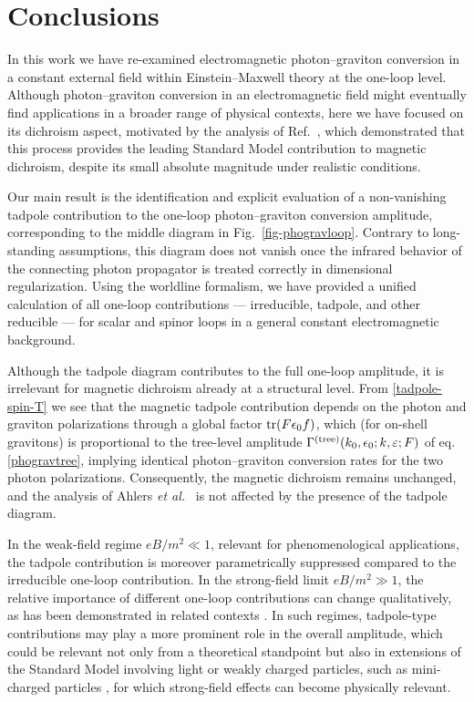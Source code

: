 \documentclass[a4paper,11pt]{article}
\begin{document}
\section{Conclusions}
\label{conc}
In this work we have re-examined electromagnetic photon–graviton conversion in a constant external field within Einstein–Maxwell theory at the one-loop level. Although photon–graviton conversion in an electromagnetic field might eventually find applications in a broader range of physical contexts, here we have focused on its dichroism aspect, motivated by the analysis of Ref.~\cite{ahjari}, which demonstrated that this process provides the leading Standard Model contribution to magnetic dichroism, despite its small absolute magnitude under realistic conditions.

Our main result is the identification and explicit evaluation of a non-vanishing tadpole contribution to the one-loop photon–graviton conversion amplitude, corresponding to the middle diagram in Fig.~\ref{fig-phogravloop}. Contrary to long-standing assumptions, this diagram does not vanish once the infrared behavior of the connecting photon propagator is treated correctly in dimensional regularization. Using the worldline formalism, we have provided a unified calculation of all one-loop contributions — irreducible, tadpole, and other reducible — for scalar and spinor loops in a general constant electromagnetic background.

Although the tadpole diagram contributes to the full one-loop amplitude, it is irrelevant for magnetic dichroism already at a structural level.
From \eqref{tadpole-spin-T} we see that the magnetic tadpole contribution depends on the photon and graviton polarizations through a global factor
${\rm tr}(F\epsilon_0 f)$, which (for on-shell gravitons) is proportional to the tree-level amplitude
$\Gamma^{\rm (tree)}(k_0,\epsilon_0;k,\varepsilon;F)$ of eq. \eqref{phogravtree},
implying identical photon–graviton conversion rates for the two photon polarizations. Consequently, the magnetic dichroism remains unchanged, and the analysis of Ahlers \textit{et al.}~\cite{ahjari} is not affected by the presence of the tadpole diagram.

In the weak-field regime $eB/m^2\ll1$, relevant for phenomenological applications, the tadpole contribution is moreover parametrically suppressed compared to the irreducible one-loop contribution. In the strong-field limit $eB/m^2\gg1$, the relative importance of different one-loop contributions can change qualitatively, as has been demonstrated in related contexts \cite{karbstein-19}. In such regimes, tadpole-type contributions may play a more prominent role in the overall amplitude, which could be relevant not only from a theoretical standpoint but also in extensions of the Standard Model involving light or weakly charged particles, such as mini-charged particles \cite{doebrich-12}, for which strong-field effects can become physically relevant.
\end{document}

